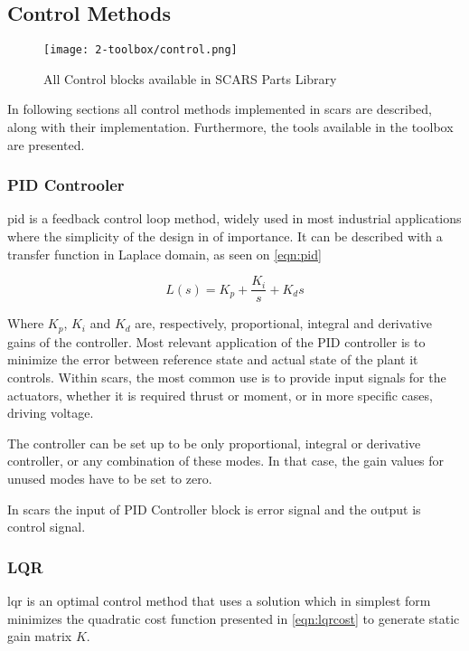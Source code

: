 \subsection{Control Methods}\label{sec:control}
    \begin{figure}[H]
        \centering
        \texttt{[image: 2-toolbox/control.png]}
        \caption{All Control blocks available in SCARS Parts Library}
        \label{fig:control}
    \end{figure}
    In following sections all control methods implemented in \ac{scars} are described, along with their implementation. Furthermore, the tools available in the toolbox are presented. 
    
    \subsubsection{PID Controoler}

        \ac{pid} is a feedback control loop method, widely used in most industrial applications where the simplicity of the design in of importance. It can be described with a transfer function in Laplace domain, as seen on \autoref{eqn:pid}
        
        \begin{equation}
            L(s) = K_p + \frac{K_i}{s} + K_d s
        \end{equation}\label{eqn:pid}

        Where $K_p$, $K_i$ and $K_d$ are, respectively, proportional, integral and derivative gains of the controller. Most relevant application of the PID controller is to minimize the error between reference state and actual state of the plant it controls. Within \ac{scars}, the most common use is to provide input signals for the actuators, whether it is required thrust or moment, or in more specific cases, driving voltage.

        The controller can be set up to be only proportional, integral or derivative controller, or any combination of these modes. In that case, the gain values for unused modes have to be set to zero.

        In \ac{scars} the input of PID Controller block is error signal and the output is control signal.  
    
    \subsubsection{LQR}\label{sec:lqr}
        \ac{lqr} is an optimal control method that uses a solution which in simplest form minimizes the quadratic cost function presented in \autoref{eqn:lqrcost} to generate static gain matrix $K$.


